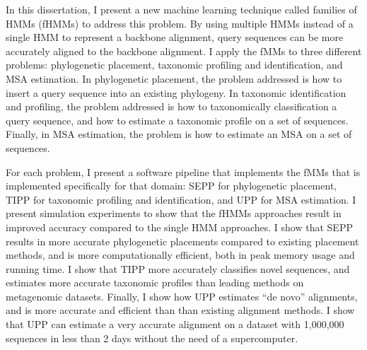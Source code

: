 \documentclass[12pt]{report}	%
\theoremstyle{definition}
\theoremstyle{remark}
\begin{document}
In this dissertation, I present a new machine learning technique called families of HMMs (fHMMs) to address this problem.  By using multiple HMMs instead of a single HMM to represent a backbone alignment, query sequences can be more accurately aligned to the backbone alignment.  I apply the fMMs to three different problems: phylogenetic placement, taxonomic profiling and identification, and MSA estimation.  In phylogenetic placement, the problem addressed is how to insert a query sequence into an existing phylogeny.  In taxonomic identification and profiling, the problem addressed is how to taxonomically classification a query sequence, and how to estimate a taxonomic profile on a set of sequences.  Finally, in MSA estimation, the problem is how to estimate an MSA on a set of sequences.

For each problem, I present a software pipeline that implements the fMMs that is implemented specifically for that domain: SEPP for phylogenetic placement, TIPP for taxonomic profiling and identification, and UPP for MSA estimation.  I present simulation experiments to show that the fHMMs approaches result in improved accuracy compared to the single HMM approaches.  I show that SEPP results in more accurate phylogenetic placements compared to existing placement methods, and is more computationally efficient, both in peak memory usage and running time.  I show that TIPP more accurately classifies novel sequences, and estimates more accurate taxonomic profiles than leading methods on metagenomic datasets.  Finally, I show how UPP estimates ``de novo'' alignments, and is more accurate and efficient than than existing alignment methods.  I show that UPP can estimate a very accurate alignment on a dataset with 1,000,000 sequences in less than 2 days without the need of a supercomputer.

\tableofcontents   %

\listoftables      %
\listoffigures     %



%
%
% 
% 
% 
% 
% 
% 







\end{document}
